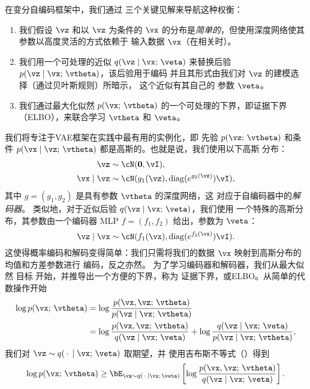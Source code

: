 \documentclass[../../book-main.tex]{subfiles}
\begin{document}
在变分自编码框架中，我们通过
三个关键见解来导航这种权衡：
\begin{enumerate}
\item 我们假设 $\vz$ 和以 $\vz$ 为条件的 $\vx$ 的分布是\textit{简单的}，但使用深度网络使其参数以高度灵活的方式依赖于
  输入数据 $\vx$（在相关时）。
\item 我们用一个可处理的近似 $q(\vz \mid \vx;\, \veta)$ 来替换后验 $p(\vz \mid \vx;\, \vtheta)$，该后验用于编码
  并且其形式由我们对 $\vz$ 的建模选择（通过贝叶斯规则）所暗示，
  这个近似有其自己的
  参数 $\veta$。
\item 我们通过最大化似然 $p(\vx ;\, \vtheta)$ 的一个可处理的下界，即证据下界（ELBO），来联合学习 $\vtheta$ 和 $\veta$。
\end{enumerate}
我们将专注于VAE框架在实践中最有用的实例化，即
先验 $p(\vz ;\, \vtheta)$ 和条件 $p(\vx \mid \vz;\,
\vtheta)$ 都是高斯的。也就是说，我们使用以下高斯
分布：
\begin{align*}
\vz &\sim \cN(\Zero, \vI), \\
\vx \mid \vz &\sim \cN(g_1(\vz), \diag(e^{g_2(\vz)}) \vI),
\end{align*}
其中 $g = (g_1, g_2)$ 是具有参数 $\vtheta$ 的深度网络，这
对应于自编码器中的\textit{解码器}。
类似地，对于近似后验 $q(\vz \mid \vx;\, \veta)$，我们使用
一个特殊的高斯分布，其参数由一个编码器
MLP $f = (f_1, f_2)$ 给出，参数为 $\veta$：
\begin{equation*}
\vz \mid \vx \sim \cN(f_1(\vx), \diag(e^{f_2(\vx)}) \vI).
\end{equation*}
这使得概率编码和解码变得简单：我们只需将我们的数据
$\vx$ 映射到高斯分布的均值和方差参数进行
编码，反之亦然。
为了学习编码器和解码器，我们从最大似然
目标  开始，并推导出一个方便的下界，称为
证据下界，或ELBO。从简单的代数操作开始
\begin{align*}
\log p(\vx;\, \vtheta) &=
\log \frac{p(\vx, \vz;\, \vtheta)}{p(\vz \mid \vx;\, \vtheta)}
\\
&=
\log \frac{p(\vx, \vz;\, \vtheta)}{q(\vz \mid \vx;\, \veta)}
+
\log \frac{q(\vz \mid \vx;\, \veta)}{p(\vz \mid \vx;\, \vtheta)},
\end{align*}
我们对 $\vz \sim q(\,\cdot\, \mid
\vx;\, \veta)$ 取期望，并
使用吉布斯不等式（）得到
\begin{equation*}
\log p(\vx;\, \vtheta)
\geq
\bE_{\vz \sim q(\,\cdot\, \mid \vx ;\, \veta)} \left[
  \log \frac{p(\vx, \vz;\, \vtheta)}{q(\vz \mid \vx;\, \veta)}
\right].
\end{equation*}
\end{document}
